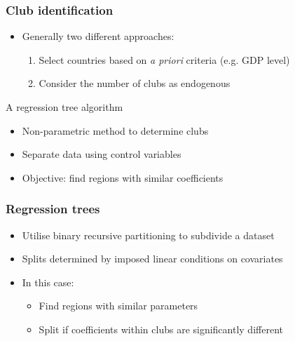 \documentclass{beamer}
\begin{document}
\begin{frame}
  \frametitle{Club identification}
  \begin{itemize}
  \item Generally two different approaches:
    \begin{enumerate}
    \item Select countries based on \emph{a priori} criteria (e.g. GDP level)
    \item Consider the number of clubs as endogenous
    \end{enumerate}
  \end{itemize}
  \begin{block}{A regression tree algorithm}
    \begin{itemize}
    \item Non-parametric method to determine clubs
    \item Separate data using control variables
    \item Objective: find regions with similar coefficients 
    \end{itemize}
  \end{block}
\end{frame}

\begin{frame}
  \frametitle{Regression trees}
  \begin{itemize}
  \item Utilise binary recursive partitioning to subdivide a dataset
  \item Splits determined by imposed linear conditions on covariates
  \item In this case:
    \begin{itemize}
    \item Find regions with similar parameters 
    \item Split if coefficients within clubs are significantly different
    \end{itemize}
  \end{itemize}
\end{frame}
\end{document}
